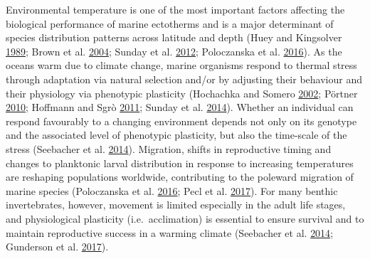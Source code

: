 \documentclass[a4paper,10pt, oneside]{memoir}
\begin{document}
Environmental temperature is one of the most important factors affecting the biological performance of marine ectotherms and is a major determinant of species distribution patterns across latitude and depth (Huey and Kingsolver \protect\hyperlink{ref-Huey1989}{1989}; Brown et al. \protect\hyperlink{ref-Brown2004}{2004}; Sunday et al. \protect\hyperlink{ref-Sunday2012}{2012}; Poloczanska et al. \protect\hyperlink{ref-Poloczanska2016}{2016}).
As the oceans warm due to climate change, marine organisms respond to thermal stress through adaptation via natural selection and/or by adjusting their behaviour and their physiology via phenotypic plasticity (Hochachka and Somero \protect\hyperlink{ref-Hochachka2002}{2002}; Pörtner \protect\hyperlink{ref-Portner2010}{2010}; Hoffmann and Sgrò \protect\hyperlink{ref-Hoffmann2011}{2011}; Sunday et al. \protect\hyperlink{ref-Sunday2014}{2014}).
Whether an individual can respond favourably to a changing environment depends not only on its genotype and the associated level of phenotypic plasticity, but also the time-scale of the stress (Seebacher et al. \protect\hyperlink{ref-Seebacher2014}{2014}). Migration, shifts in reproductive timing and changes to planktonic larval distribution in response to increasing temperatures are reshaping populations worldwide, contributing to the poleward migration of marine species (Poloczanska et al. \protect\hyperlink{ref-Poloczanska2016}{2016}; Pecl et al. \protect\hyperlink{ref-Pecl2017}{2017}).
For many benthic invertebrates, however, movement is limited especially in the adult life stages, and physiological plasticity (i.e.~acclimation) is essential to ensure survival and to maintain reproductive success in a warming climate (Seebacher et al. \protect\hyperlink{ref-Seebacher2014}{2014}; Gunderson et al. \protect\hyperlink{ref-Gunderson2017}{2017}).
\end{document}
